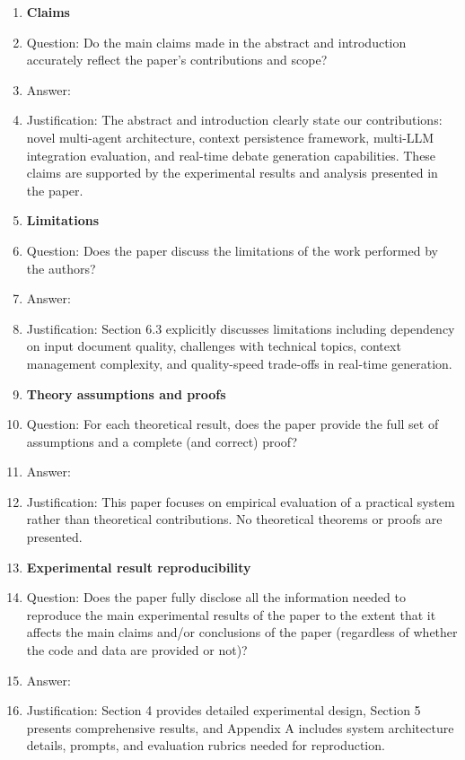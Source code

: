 \documentclass{article}
\begin{document}
\begin{enumerate}

\item {\bf Claims}
    \item[] Question: Do the main claims made in the abstract and introduction accurately reflect the paper's contributions and scope?
    \item[] Answer: \answerYes{} 
    \item[] Justification: The abstract and introduction clearly state our contributions: novel multi-agent architecture, context persistence framework, multi-LLM integration evaluation, and real-time debate generation capabilities. These claims are supported by the experimental results and analysis presented in the paper.
    
\item {\bf Limitations}
    \item[] Question: Does the paper discuss the limitations of the work performed by the authors?
    \item[] Answer: \answerYes{} 
    \item[] Justification: Section 6.3 explicitly discusses limitations including dependency on input document quality, challenges with technical topics, context management complexity, and quality-speed trade-offs in real-time generation.
    
\item {\bf Theory assumptions and proofs}
    \item[] Question: For each theoretical result, does the paper provide the full set of assumptions and a complete (and correct) proof?
    \item[] Answer: \answerNA{} 
    \item[] Justification: This paper focuses on empirical evaluation of a practical system rather than theoretical contributions. No theoretical theorems or proofs are presented.
    
\item {\bf Experimental result reproducibility}
    \item[] Question: Does the paper fully disclose all the information needed to reproduce the main experimental results of the paper to the extent that it affects the main claims and/or conclusions of the paper (regardless of whether the code and data are provided or not)?
    \item[] Answer: \answerYes{} 
    \item[] Justification: Section 4 provides detailed experimental design, Section 5 presents comprehensive results, and Appendix A includes system architecture details, prompts, and evaluation rubrics needed for reproduction.
    

\end{enumerate}
\end{document}
